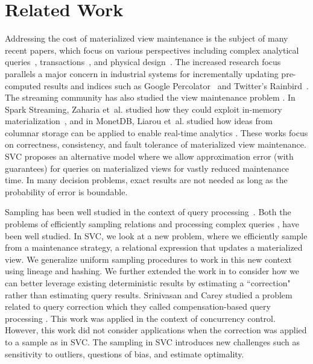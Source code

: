 \vspace{-.75em}
\section{Related Work}\label{related}
\vspace{-.25em}
Addressing the cost of materialized view maintenance is the subject of many recent papers, which
focus on various perspectives including complex analytical queries~\cite{nikolic2014linview}, transactions~\cite{bailis2014scalable}, and physical design~\cite{lefevre2014opportunistic}.
The increased research focus parallels a major concern in industrial systems for incrementally updating pre-computed results and indices such as Google Percolator~\cite{percolator} and Twitter's Rainbird~\cite{rainbird}.
The streaming community has also studied the view maintenance problem \cite{abadi2003aurora,golab2011consistency, golab2012scalable, he2010comet, ghanem2010supporting, KrishnamurthyFDFGLT10}. In Spark Streaming, Zaharia et~al. studied how they could exploit in-memory materialization~\cite{zaharia2012discretized}, and in MonetDB, Liarou et~al. studied how ideas from columnar storage can be applied to enable real-time analytics \cite{liarou2012monetdb}.
These works focus on correctness, consistency, and fault tolerance of materialized view maintenance.
SVC proposes an alternative model where we allow approximation error (with guarantees) for queries on materialized views for vastly reduced maintenance time.
In many decision problems, exact results are not needed as long as the probability of error is boundable. 

Sampling has been well studied in the context of query processing~\cite{AgarwalMPMMS13, olken1993random, garofalakis2001approximate}. 
Both the problems of efficiently sampling relations \cite{olken1993random} and processing complex queries \cite{agarwalknowing}, have been well studied. 
In SVC, we look at a new problem, where we efficiently sample from a maintenance strategy, a relational expression that updates a materialized view.
We generalize uniform sampling procedures to work in this new context using lineage \cite{DBLP:journals/vldb/CuiW03} and hashing.
We further extended the work in \cite{AgarwalMPMMS13, agarwalknowing} to consider how we can better leverage existing deterministic results by estimating a ``correction" rather than estimating query results. 
Srinivasan and Carey studied a problem related to query correction which they called compensation-based query processing \cite{srinivasanC92}.
This work was applied in the context of concurrency control.
However, this work did not consider applications when the correction was applied to a sample as in SVC.
The sampling in SVC introduces new challenges such as sensitivity to outliers, questions of bias, and estimate optimality. 


